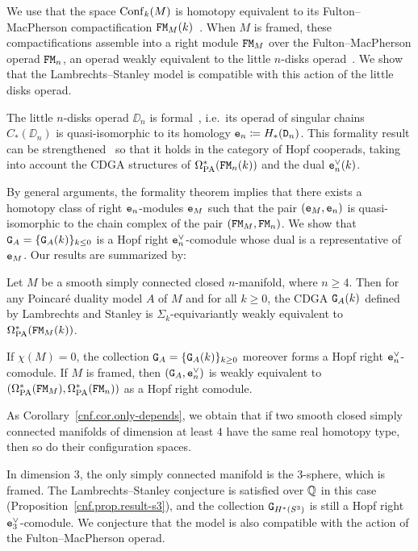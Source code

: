 We use that the space $\Conf_{k}(M)$ is homotopy equivalent to its Ful\-ton--Mac\-Pher\-son compactification $\FM_{M}(k)$~\cite{FultonMacPherson1994,AxelrodSinger1994,Sinha2004}.
When $M$ is framed, these compactifications assemble into a right module $\FM_{M}$ over the Fulton--MacPherson operad $\FM_{n}$, an operad weakly equivalent to the little $n$-disks operad~\cite{May1972,BoardmanVogt1973}.
We show that the Lambrechts--Stanley model is compatible with this action of the little disks operad.

The little $n$-disks operad $\DD_{n}$ is formal~\cite{Kontsevich1999,Tamarkin2003,LambrechtsVolic2014,FresseWillwacher2015}, i.e.\ its operad of singular chains $C_{*}(\DD_{n})$ is quasi-isomorphic to its homology $\en \coloneqq H_{*}(\DD_{n})$.
This formality result can be strengthened~\cite{LambrechtsVolic2014,FresseWillwacher2015} so that it holds in the category of Hopf cooperads, taking into account the CDGA structures of $\OmPA^{*}(\FM_{n}(k))$ and the dual $\enV(k)$.

By general arguments, the formality theorem implies that there exists a homotopy class of right $\en$-modules $\en[M]$ such that the pair $(\en[M], \en)$ is quasi-isomorphic to the chain complex of the pair $(\FM_{M}, \FM_{n})$.
We show that $\GG{A} = \{\GG{A}(k)\}_{k \leq 0}$ is a Hopf right $\enV$-comodule whose dual is a representative of $\en[M]$.
Our results are summarized by:

\begin{theoremintro}
  \label{cnf.thm.A}
  Let $M$ be a smooth simply connected closed $n$-manifold, where $n \geq 4$.
  Then for any Poincaré duality model $A$ of $M$ and for all $k \geq 0$, the CDGA $\GG{A}(k)$ defined by Lambrechts and Stanley is $\Sigma_{k}$-equivariantly weakly equivalent to $\OmPA^{*}(\FM_{M}(k))$.

  If $\chi(M) = 0$, the collection $\GG{A} = \{ \GG{A}(k) \}_{k \geq 0}$ moreover forms a Hopf right $\enV$-comodule.
  If $M$ is framed, then $(\GG{A}, \enV)$ is weakly equivalent to $(\OmPA^{*}(\FM_{M}), \OmPA^{*}(\FM_{n}))$ as a Hopf right comodule.
\end{theoremintro}

As Corollary~\ref{cnf.cor.only-depends}, we obtain that if two smooth closed simply connected manifolds of dimension at least $4$ have the same real homotopy type, then so do their configuration spaces.

In dimension $3$, the only simply connected manifold is the $3$-sphere, which is framed.
The Lambrechts--Stanley conjecture is satisfied over $\Q$ in this case (Proposition~\ref{cnf.prop.result-s3}), and the collection $\GG{H^{*}(S^{3})}$ is still a Hopf right $\enV[3]$-comodule.
We conjecture that the model is also compatible with the action of the Fulton--MacPherson operad.

